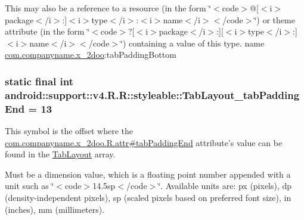 This may also be a reference to a resource (in the form \char`\"{}$<$code$>$@\mbox{[}$<$i$>$package$<$/i$>$:\mbox{]}$<$i$>$type$<$/i$>$:$<$i$>$name$<$/i$>$$<$/code$>$\char`\"{}) or theme attribute (in the form \char`\"{}$<$code$>$?\mbox{[}$<$i$>$package$<$/i$>$:\mbox{]}\mbox{[}$<$i$>$type$<$/i$>$:\mbox{]}$<$i$>$name$<$/i$>$$<$/code$>$\char`\"{}) containing a value of this type.  name \hyperlink{namespacecom_1_1companyname_1_1x__2doo}{com.companyname.x\_\-2doo}:tabPaddingBottom \hypertarget{classandroid_1_1support_1_1v4_1_1_r_1_1styleable_ed971a95ce0c06adb144c8d88ab0fe8f}{
\subsubsection[{TabLayout\_\-tabPaddingEnd}]{\setlength{\rightskip}{0pt plus 5cm}static final int android::support::v4.R.R::styleable::TabLayout\_\-tabPaddingEnd = 13}}
\label{classandroid_1_1support_1_1v4_1_1_r_1_1styleable_ed971a95ce0c06adb144c8d88ab0fe8f}


This symbol is the offset where the \hyperlink{classcom_1_1companyname_1_1x__2doo_1_1_r_1_1attr_3efb6af986d758781acf5fa284a602e3}{com.companyname.x\_\-2doo.R.attr\#tabPaddingEnd} attribute's value can be found in the \hyperlink{classandroid_1_1support_1_1v4_1_1_r_1_1styleable_d1f1104cdc4fac0ab4797d48f7efe351}{TabLayout} array.

Must be a dimension value, which is a floating point number appended with a unit such as \char`\"{}$<$code$>$14.5sp$<$/code$>$\char`\"{}. Available units are: px (pixels), dp (density-independent pixels), sp (scaled pixels based on preferred font size), in (inches), mm (millimeters). 

